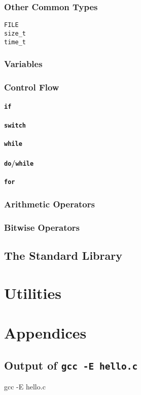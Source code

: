 \documentclass[a4paper,10pt]{report}
\newcommand{\kw}[1]{\texttt{#1}}
\begin{document}
\section{Other Common Types}

\begin{description}
  \item[\kw{FILE}]
  \item[\kw{size\_t}]
  \item[\kw{time\_t}]
\end{description}

\section{Variables}

\section{Control Flow}

\subsection{\kw{if}}

\subsection{\kw{switch}}

\subsection{\kw{while}}

\subsection{\kw{do}/\kw{while}}

\subsection{\kw{for}}

\section{Arithmetic Operators}

\section{Bitwise Operators}

\chapter{The Standard Library}

\part{Utilities}

\part{Appendices}

\appendix

\chapter{Output of \texttt{gcc -E hello.c}}
\label{cpphello}

gcc -E hello.c
\END
\end{document}
